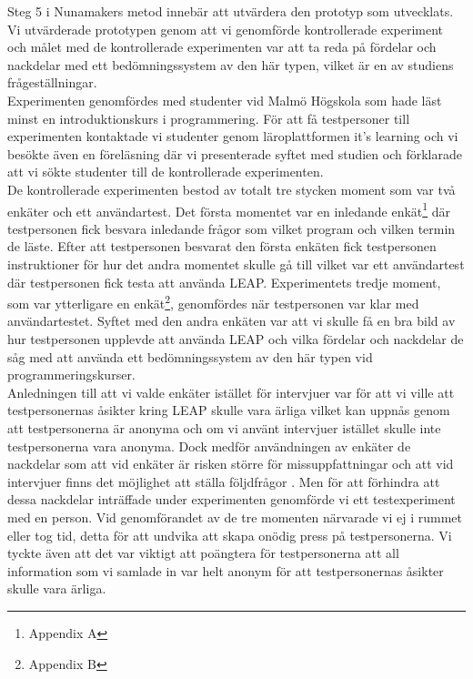 \documentclass[a4paper,11pt]{article}
\begin{document}
{Steg 5 i Nunamakers metod innebär att utvärdera den prototyp som utvecklats. Vi utvärderade prototypen genom att vi genomförde kontrollerade experiment och målet med de kontrollerade experimenten var att ta reda på fördelar och nackdelar med ett bedömningssystem av den här typen, vilket är en av studiens frågeställningar. 
\\
Experimenten genomfördes med studenter vid Malmö Högskola som hade läst minst en introduktionskurs i programmering. För att få testpersoner till experimenten kontaktade vi studenter genom läroplattformen it's learning och vi besökte även en föreläsning där vi presenterade syftet med studien och förklarade att vi sökte studenter till de kontrollerade experimenten.
\\
De kontrollerade experimenten bestod av totalt tre stycken moment som var två enkäter och ett användartest. Det första momentet var en inledande enkät\footnote{Appendix A} där testpersonen fick besvara inledande frågor som vilket program och vilken termin de läste. Efter att testpersonen besvarat den första enkäten fick testpersonen instruktioner för hur det andra momentet skulle gå till vilket var ett användartest där testpersonen fick testa att använda LEAP. Experimentets tredje moment, som var ytterligare en enkät\footnote{Appendix B}, genomfördes när testpersonen var klar med användartestet. Syftet med den andra enkäten var att vi skulle få en bra bild av hur testpersonen upplevde att använda LEAP och vilka fördelar och nackdelar de såg med att använda ett bedömningssystem av den här typen vid programmeringskurser.
\\
Anledningen till att vi valde enkäter istället för intervjuer var för att vi ville att testpersonernas åsikter kring LEAP skulle vara ärliga vilket kan uppnås genom att testpersonerna är anonyma och om vi använt intervjuer istället skulle inte testpersonerna vara anonyma. Dock medför användningen av enkäter de nackdelar som att vid enkäter är risken större för missuppfattningar och att vid intervjuer finns det möjlighet att ställa följdfrågor \cite{seminarieboken}. Men för att förhindra att dessa nackdelar inträffade under experimenten genomförde vi ett testexperiment med en person. Vid genomförandet av de tre momenten närvarade vi ej i rummet eller tog tid, detta för att undvika att skapa onödig press på testpersonerna. Vi tyckte även att det var viktigt att poängtera för testpersonerna att all information som vi samlade in var helt anonym för att testpersonernas åsikter skulle vara ärliga.

\newpage
}
\end{document}

